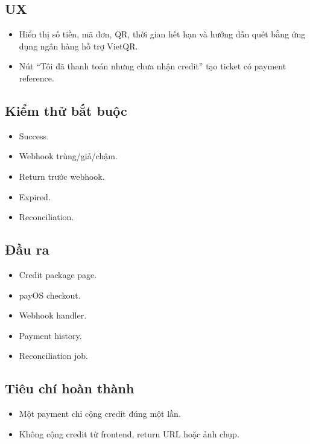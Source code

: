 \documentclass[
  11pt,
  a4paper,
]{article}
\begin{document}
\subsection{UX}\label{ux-1}

\begin{itemize}
\item
  Hiển thị số tiền, mã đơn, QR, thời gian hết hạn và hướng dẫn quét bằng
  ứng dụng ngân hàng hỗ trợ VietQR.
\item
  Nút ``Tôi đã thanh toán nhưng chưa nhận credit'' tạo ticket có payment
  reference.
\end{itemize}

\subsection{Kiểm thử bắt
buộc}\label{kiux1ec3m-thux1eed-bux1eaft-buux1ed9c-7}

\begin{itemize}
\item
  Success.
\item
  Webhook trùng/giả/chậm.
\item
  Return trước webhook.
\item
  Expired.
\item
  Reconciliation.
\end{itemize}

\subsection{Đầu ra}\label{ux111ux1ea7u-ra-9}

\begin{itemize}
\item
  Credit package page.
\item
  payOS checkout.
\item
  Webhook handler.
\item
  Payment history.
\item
  Reconciliation job.
\end{itemize}

\subsection{Tiêu chí hoàn
thành}\label{tiuxeau-chuxed-houxe0n-thuxe0nh-9}

\begin{itemize}
\item
  Một payment chỉ cộng credit đúng một lần.
\item
  Không cộng credit từ frontend, return URL hoặc ảnh chụp.
\end{itemize}
\end{document}
